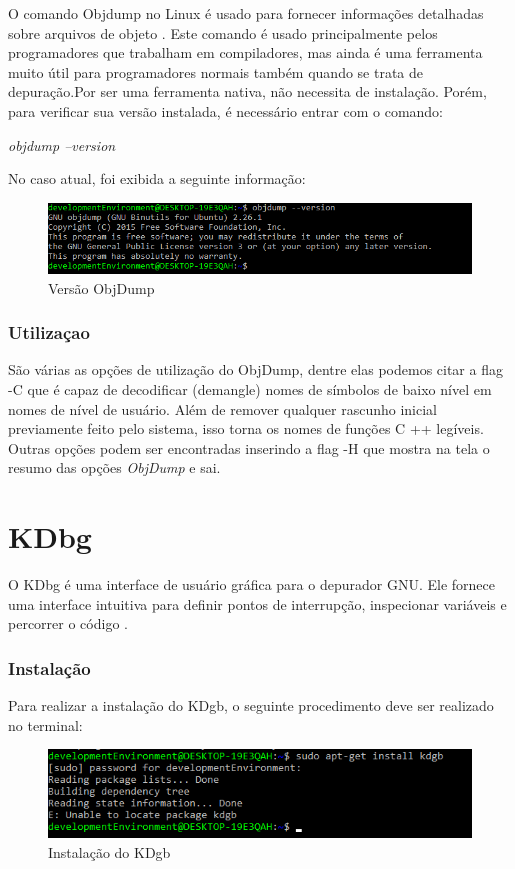 \documentclass[12pt]{article}
\begin{document}
O comando Objdump no Linux é usado para fornecer informações detalhadas sobre arquivos de objeto \cite{santosa2006understanding}. Este comando é usado principalmente pelos programadores que trabalham em compiladores, mas ainda é uma ferramenta muito útil para programadores normais também quando se trata de depuração.Por ser uma ferramenta nativa, não necessita de instalação. Porém, para verificar sua versão instalada, é necessário entrar com o comando:

\textit{objdump --version}

No caso atual, foi exibida a seguinte informação:
\begin{figure}[ht]
\centering
\includegraphics[width=.75\textwidth]{2.png}
\caption{Versão ObjDump}
\label{fig:exampleFig1}
\end{figure}

\subsubsection{Utilizaçao}
São várias as opções de utilização do ObjDump, dentre elas podemos citar a flag -C que é capaz de decodificar (demangle) nomes de símbolos de baixo nível em nomes de nível de usuário. Além de remover qualquer rascunho inicial previamente feito pelo sistema, isso torna os nomes de funções C ++ legíveis. Outras opções podem ser encontradas inserindo a flag -H que mostra na tela o resumo das opções \textit{ObjDump} e sai.

\section{KDbg}

O KDbg é uma interface de usuário gráfica para o depurador GNU. Ele fornece uma interface intuitiva para definir pontos de interrupção, inspecionar variáveis e percorrer o código \cite{sixt2009kdbg}.

\subsubsection{Instalação}

Para realizar a instalação do KDgb, o seguinte procedimento deve ser realizado no terminal:

\begin{figure}[ht]
\centering
\includegraphics[width=.75\textwidth]{3.png}
\caption{Instalação do KDgb}
\label{fig:exampleFig1}
\end{figure}
\end{document}
